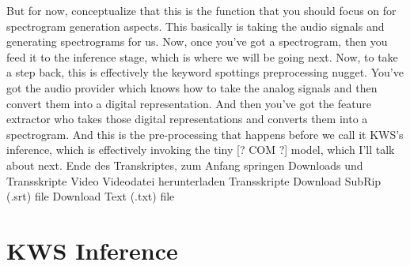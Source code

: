      But for now, conceptualize that this is the function that you should focus on
     for spectrogram generation aspects.
     This basically is taking the audio signals
     and generating spectrograms for us.
     Now, once you've got a spectrogram, then you
     feed it to the inference stage, which is where we will be going next.
     Now, to take a step back, this is effectively the keyword spottings
     preprocessing nugget.
     You've got the audio provider which knows how to take the analog signals
     and then convert them into a digital representation.
     And then you've got the feature extractor
     who takes those digital representations and converts them into a spectrogram.
     And this is the pre-processing that happens
     before we call it KWS's inference, which is effectively
     invoking the tiny [? COM ?] model, which I'll talk about next.
     Ende des Transkriptes, zum Anfang springen
     Downloads und Transskripte
     Video
     Videodatei herunterladen
     Transskripte
     Download SubRip (.srt) file
     Download Text (.txt) file   
     
\section{KWS Inference}

